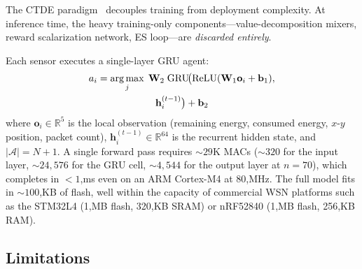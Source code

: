 The CTDE paradigm~\cite{kraemer2016multi,lowe2017multi} decouples training from deployment complexity. At inference time, the heavy training-only components---value-decomposition mixers, reward scalarization network, ES loop---are \emph{discarded entirely}.

\begin{table}[!t]
\caption{Component deployment map under CTDE. Only the per-sensor agent and GAPF controller are active at inference.}
\label{tab:deployment_components}
\renewcommand{\arraystretch}{1.0}
\end{table}

Each sensor executes a single-layer GRU agent:
\begin{multline}
a_i = \operatorname*{arg\,max}_{j}\; \mathbf{W}_2 \;\mathrm{GRU}\!\bigl(\mathrm{ReLU}(\mathbf{W}_1 \mathbf{o}_i + \mathbf{b}_1),\\
\mathbf{h}_{i}^{(t-1)}\bigr) + \mathbf{b}_2
\label{eq:agent_forward}
\end{multline}
where $\mathbf{o}_i \in \mathbb{R}^5$ is the local observation (remaining energy, consumed energy, $x$-$y$ position, packet count), $\mathbf{h}_i^{(t-1)} \in \mathbb{R}^{64}$ is the recurrent hidden state, and $|\mathcal{A}|{=}N{+}1$. A single forward pass requires ${\sim}29$K MACs (${\sim}320$ for the input layer, ${\sim}24{,}576$ for the GRU cell, ${\sim}4{,}544$ for the output layer at $n{=}70$), which completes in $<1$,ms even on an ARM Cortex-M4 at 80,MHz. The full model fits in ${\sim}100$,KB of flash, well within the capacity of commercial WSN platforms such as the STM32L4 (1,MB flash, 320,KB SRAM) or nRF52840 (1,MB flash, 256,KB RAM).

\subsection{Limitations}
\label{sec:limitations}

